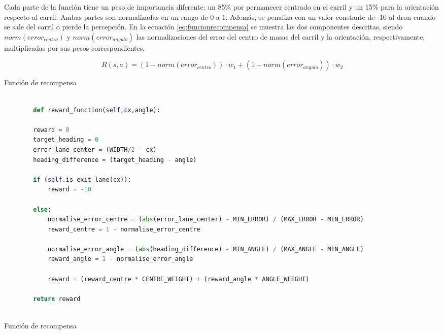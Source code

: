 \begin{itemize}
    Cada parte de la función tiene un peso de importancia diferente: un 85\% por permanecer centrado en el carril y un 15\% para la orientación respecto al carril. Ambas partes 
    son normalizadas en un rango de 0 a 1. Además, se penaliza con un valor constante de -10 al dron cuando se sale del carril o pierde la percepción. En la ecuación 
    \ref{eq:funcionrecompensa} se muestra las dos componentes descritas, siendo $norm(error_{centro})$ y $norm(error_{angulo})$ las normalizaciones del error del centro de 
    masas del carril y la orientación, respectivamente, multiplicadas por sus pesos correspondientes.

      \begin{myequation}[H]
        \begin{equation}
          R(s,a) = (1 - norm(error_{centro})) \cdot w_{1} + 
          (1 - norm(error_{angulo})) \cdot w_{2}
          \label{eq:funcionrecompensa}
        \end{equation}
        \caption{Función de recompensa}
      \end{myequation}

   
    \begin{code}[H]
      \begin{lstlisting}[language=Python]
  
        def reward_function(self,cx,angle):

        reward = 0
        target_heading = 0
        error_lane_center = (WIDTH/2 - cx)
        heading_difference = (target_heading - angle) 
                
        if (self.is_exit_lane(cx)):
            reward = -10

        else:
            normalise_error_centre = (abs(error_lane_center) - MIN_ERROR) / (MAX_ERROR - MIN_ERROR)
            reward_centre = 1 - normalise_error_centre

            normalise_error_angle = (abs(heading_difference) - MIN_ANGLE) / (MAX_ANGLE - MIN_ANGLE)
            reward_angle = 1 - normalise_error_angle

            reward = (reward_centre * CENTRE_WEIGHT) + (reward_angle * ANGLE_WEIGHT)
            
        return reward
       
      \end{lstlisting}
      \caption[Función de recompensa]{Función de recompensa}
      \label{cod:recompensa}
      \vspace{-1.5em}
      \end{code}


\end{itemize}
